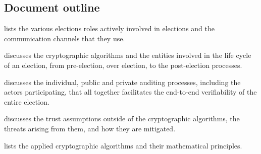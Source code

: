 \subsection{Document outline}
 lists the various elections roles actively involved in elections and the communication channels that they use.

 discusses the cryptographic algorithms and the entities involved in the life cycle of an election, from pre-election, over election, to the post-election processes.

 discusses the individual, public and private auditing processes, including the actors participating, that all together facilitates the  end-to-end verifiability of the entire election.

 discusses the trust assumptions outside of the cryptographic algorithms, the threats arising from them, and how they are mitigated.

 lists the applied cryptographic algorithms and their mathematical principles.
